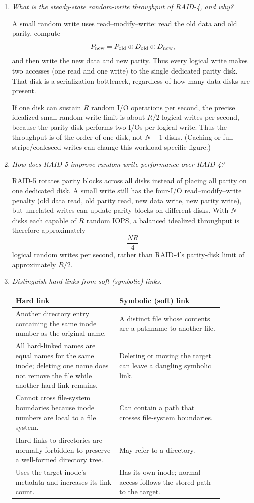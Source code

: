 \begin{enumerate}
\item[(a)] \emph{What is the steady-state random-write throughput of RAID-4,
and why?}

A small random write uses read--modify--write:
read the old data and old parity, compute
\[
P_{\rm new}=P_{\rm old}\mathbin{\oplus}D_{\rm old}
             \mathbin{\oplus}D_{\rm new},
\]
and then write the new data and new parity.  Thus every logical write makes
two accesses (one read and one write) to the single dedicated parity disk.
That disk is a serialization bottleneck, regardless of how many data disks
are present.

If one disk can sustain \(R\) random I/O operations per second, the precise
idealized small-random-write limit is about \(R/2\) logical writes per
second, because the parity disk performs two I/Os per logical write.  Thus
the throughput is of the order of one disk, not \(N-1\) disks.  (Caching or
full-stripe/coalesced writes can change this workload-specific figure.)

\item[(b)] \emph{How does RAID-5 improve random-write performance over
RAID-4?}

RAID-5 rotates parity blocks across all disks instead of placing all parity
on one dedicated disk.  A small write still has the four-I/O
read--modify--write penalty (old data read, old parity read, new data write,
new parity write), but unrelated writes can update parity blocks on
different disks.  With \(N\) disks each capable of \(R\) random IOPS, a
balanced idealized throughput is therefore approximately
\[
\frac{NR}{4}
\]
logical random writes per second, rather than RAID-4's parity-disk limit of
approximately \(R/2\).

\item[(c)] \emph{Distinguish hard links from soft (symbolic) links.}

\begin{center}
\begin{tabular}{p{0.43\linewidth}|p{0.43\linewidth}}
\textbf{Hard link} & \textbf{Symbolic (soft) link}\\ \hline
Another directory entry containing the same inode number as the original
name. & A distinct file whose contents are a pathname to another file.\\
All hard-linked names are equal names for the same inode; deleting one name
does not remove the file while another hard link remains. &
Deleting or moving the target can leave a dangling symbolic link.\\
Cannot cross file-system boundaries because inode numbers are local to a
file system. & Can contain a path that crosses file-system boundaries.\\
Hard links to directories are normally forbidden to preserve a well-formed
directory tree. & May refer to a directory.\\
Uses the target inode's metadata and increases its link count. &
Has its own inode; normal access follows the stored path to the target.
\end{tabular}
\end{center}
\end{enumerate}
